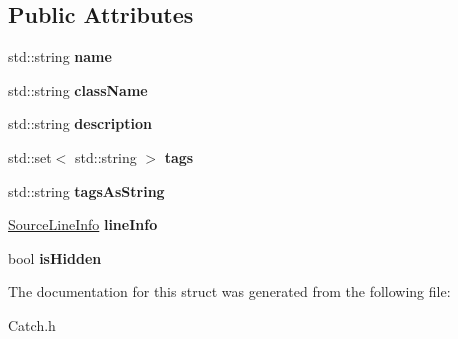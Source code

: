 \subsection*{Public Attributes}
\begin{DoxyCompactItemize}
\item 
\hypertarget{struct_catch_1_1_test_case_info_a463794e2f5cfead307c93efd134ade36}{std\-::string {\bfseries name}}\label{struct_catch_1_1_test_case_info_a463794e2f5cfead307c93efd134ade36}

\item 
\hypertarget{struct_catch_1_1_test_case_info_a1a5e0825132a38d091defdebbf2f8ce9}{std\-::string {\bfseries class\-Name}}\label{struct_catch_1_1_test_case_info_a1a5e0825132a38d091defdebbf2f8ce9}

\item 
\hypertarget{struct_catch_1_1_test_case_info_a37fe2db9425bc45f6a33893eac31198e}{std\-::string {\bfseries description}}\label{struct_catch_1_1_test_case_info_a37fe2db9425bc45f6a33893eac31198e}

\item 
\hypertarget{struct_catch_1_1_test_case_info_a045f62e7719a8760a5b456f7fd2dc97c}{std\-::set$<$ std\-::string $>$ {\bfseries tags}}\label{struct_catch_1_1_test_case_info_a045f62e7719a8760a5b456f7fd2dc97c}

\item 
\hypertarget{struct_catch_1_1_test_case_info_ac65c2d36fd36f71e9bf782b2ea245c64}{std\-::string {\bfseries tags\-As\-String}}\label{struct_catch_1_1_test_case_info_ac65c2d36fd36f71e9bf782b2ea245c64}

\item 
\hypertarget{struct_catch_1_1_test_case_info_aa9407b7f442655b51a2aad24b3fa2fd3}{\hyperlink{struct_catch_1_1_source_line_info}{Source\-Line\-Info} {\bfseries line\-Info}}\label{struct_catch_1_1_test_case_info_aa9407b7f442655b51a2aad24b3fa2fd3}

\item 
\hypertarget{struct_catch_1_1_test_case_info_a8c4c85cb2e28897721c9f5fe3950bc2f}{bool {\bfseries is\-Hidden}}\label{struct_catch_1_1_test_case_info_a8c4c85cb2e28897721c9f5fe3950bc2f}

\end{DoxyCompactItemize}


The documentation for this struct was generated from the following file\-:\begin{DoxyCompactItemize}
\item 
Catch.\-h\end{DoxyCompactItemize}
